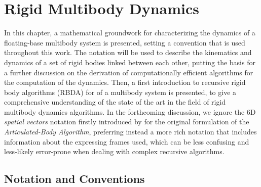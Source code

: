 \chapter{Rigid Multibody Dynamics}
\label{chp:back_RBDynamics}

In this chapter, a mathematical groundwork for characterizing the dynamics of a floating-base multibody system is presented, setting a convention that is used throughout this work. The notation will be used to describe the kinematics and dynamics of a set of rigid bodies linked between each other, putting the basis for a further discussion on the derivation of computationally efficient algorithms for the computation of the dynamics. Then, a first introduction to recursive rigid body algorithms (\ac{RBDA}) for of a multibody system is presented, to give a comprehensive understanding of the state of the art in the field of rigid multibody dynamics algorithms. In the forthcoming discussion, we ignore the 6D \textit{spatial vectors} notation firstly introduced by \citet{featherstone_rigid_2008} for the original formulation of the \textit{Articulated-Body Algorithm}, preferring instead a more rich notation that includes information about the expressing frames used, which can be less confusing and less-likely error-prone when dealing with complex recursive algorithms.

\section{Notation and Conventions}

